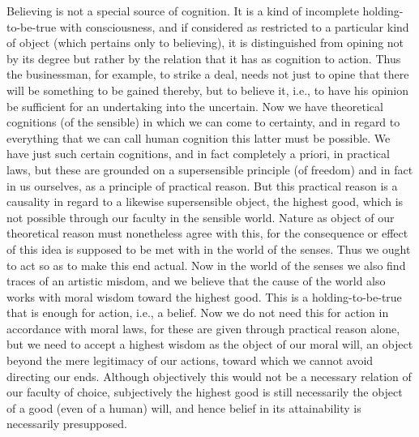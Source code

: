     Believing is not a special source of cognition. It is a kind of incomplete holding-to-be-true
    with consciousness, and if considered as restricted to a particular kind of object (which
    pertains only to believing), it is distinguished from opining not by its degree but rather by the
    relation that it has as cognition to action. Thus the businessman, for example, to strike a
    deal, needs not just to opine that there will be something to be gained thereby, but to believe
    it, i.e., to have his opinion be sufficient for an undertaking into the uncertain. Now we have
    theoretical cognitions (of the sensible) in which we can come to certainty, and in regard to
    everything that we can call human cognition this latter must be possible. We have just such
    certain cognitions, and in fact completely a priori, in practical laws, but these are grounded
    on a supersensible principle (of freedom) and in fact in us ourselves, as a principle of practical
    reason. But this practical reason is a causality in regard to a likewise supersensible object, the
    highest good, which is not possible through our faculty in the sensible world. Nature as object
    of our theoretical reason must nonetheless agree with this, for the consequence or effect of this
    idea is supposed to be met with in the world of the senses. Thus we ought to act so as to
    make this end actual.
    Now in the world of the senses we also find traces of an artistic misdom, and we believe
    that the cause of the world also works with moral wisdom toward the highest good. This is a
    holding-to-be-true that is enough for action, i.e., a belief. Now we do not need this for action
    in accordance with moral laws, for these are given through practical reason alone, but we
    need to accept a highest wisdom as the object of our moral will, an object beyond the mere
    legitimacy of our actions, toward which we cannot avoid directing our ends. Although
    objectively this would not be a necessary relation of our faculty of choice, subjectively the
    highest good is still necessarily the object of a good (even of a human) will, and hence belief
    in its attainability is necessarily presupposed.

